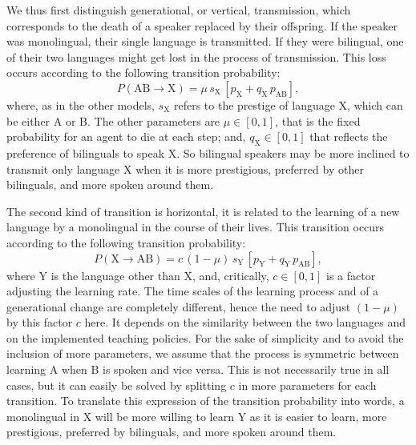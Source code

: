 \documentclass[../thesis.tex]{subfiles}
\begin{document}
We thus first distinguish generational, or vertical, transmission, which corresponds to
the death of a speaker replaced by their offspring. If the speaker was monolingual,
their single language is transmitted. If they were bilingual, one of their two languages
might get lost in the process of transmission. This loss occurs according to the
following transition probability:
\begin{equation}
    P (\text{AB} \rightarrow \text{X}) = \mu \, s_\text{X} \, \left[ p_{\text{X}} + q_\text{X} \, p_{\text{AB}} \right],
\end{equation}
where, as in the other models, $s_\text{X}$ refers to the prestige of language X, which
can be either A or B. The other parameters are $\mu \in [0, 1]$, that is the fixed
probability for an agent to die at each step; and, $q_\text{X} \in [0, 1]$ that reflects
the preference of bilinguals to speak X. So bilingual speakers may be more inclined to
transmit only language X when it is more prestigious, preferred by other bilinguals, and
more spoken around them.

The second kind of transition is horizontal, it is related to the learning of a new
language by a monolingual in the course of their lives. This transition occurs according
to the following transition probability:
\begin{equation}
    P (\text{X} \rightarrow \text{AB}) = c \, (1 - \mu) \, s_\text{Y} \, \left[ p_\text{Y} + q_\text{Y} \,  p_{\text{AB}} \right],
\end{equation}
where Y is the language other than X, and, critically, $c \in [0, 1]$ is a factor
adjusting the learning rate. The time scales of the learning process and of a
generational change are completely different, hence the need to adjust $(1-\mu)$ by this
factor $c$ here. It depends on the similarity between the two languages and on the
implemented teaching policies. For the sake of simplicity and to avoid the inclusion of
more parameters, we assume that the process is symmetric between learning A when B is
spoken and vice versa. This is not necessarily true in all cases, but it can easily be
solved by splitting $c$ in more parameters for each transition. To translate this
expression of the transition probability into words, a monolingual in X will be more
willing to learn Y as it is easier to learn, more prestigious, preferred by bilinguals,
and more spoken around them.
\end{document}
